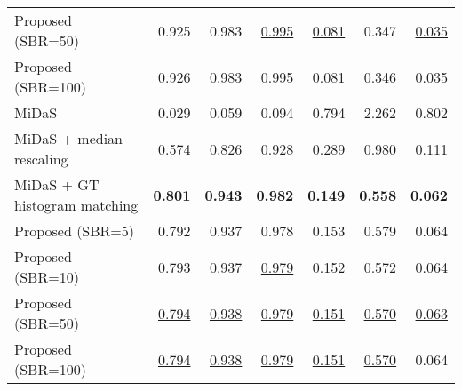 \begin{tabular}{lrrr|rrr}
Proposed (SBR=50)                  &               0.925 &               0.983 &   \underline{0.995} &  \underline{0.081} &              0.347 &  \underline{0.035} \\
Proposed (SBR=100)                 &   \underline{0.926} &               0.983 &   \underline{0.995} &  \underline{0.081} &  \underline{0.346} &  \underline{0.035} \\
\midrule
MiDaS                              &               0.029 &               0.059 &               0.094 &              0.794 &              2.262 &              0.802 \\
MiDaS + median rescaling           &               0.574 &               0.826 &               0.928 &              0.289 &              0.980 &              0.111 \\
MiDaS + GT histogram matching      &      \textbf{0.801} &      \textbf{0.943} &      \textbf{0.982} &     \textbf{0.149} &     \textbf{0.558} &     \textbf{0.062} \\
Proposed (SBR=5)                   &               0.792 &               0.937 &               0.978 &              0.153 &              0.579 &              0.064 \\
Proposed (SBR=10)                  &               0.793 &               0.937 &   \underline{0.979} &              0.152 &              0.572 &              0.064 \\
Proposed (SBR=50)                  &   \underline{0.794} &   \underline{0.938} &   \underline{0.979} &  \underline{0.151} &  \underline{0.570} &  \underline{0.063} \\
Proposed (SBR=100)                 &   \underline{0.794} &   \underline{0.938} &   \underline{0.979} &  \underline{0.151} &  \underline{0.570} &              0.064 \\
\bottomrule
\end{tabular}